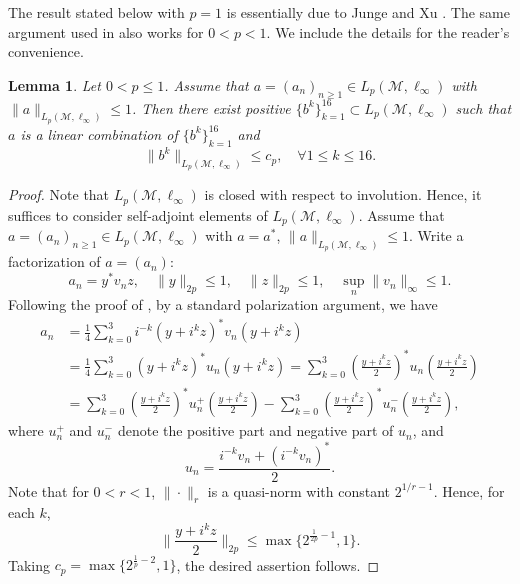 \documentclass[11]{amsart}
\numberwithin{equation}{section}
\newtheorem{lemma}[theorem]{Lemma}
\newcommand{\M}{\mathcal{M}}
\begin{document}
The  result stated below with $p=1$ is essentially due to Junge and Xu \cite[Proposition 2.1(i)]{JX2007}. The same argument used in \cite[Proposition 2.1(i)]{JX2007} also works for $0<p<1$. We include the details for the reader's convenience. 
\begin{lemma}\label{JX lemma}
Let $0<p\leq 1$. Assume that $a=(a_n)_{n\geq1}\in L_p(\M,\ell_{\infty})$ with $\|a\|_{L_p(\M,\ell_{\infty})}\leq 1$. Then there exist positive $\{b^k\}_{k=1}^{16}\subset L_p(\M,\ell_{\infty})$ such that $a$ is a linear combination of $\{b^k\}_{k=1}^{16}$ and 
$$\|b^k\|_{L_p(\M,\ell_{\infty})}\leq c_p,\quad \forall 1\leq k\leq 16.$$
\end{lemma}
\begin{proof}
Note that $L_p(\M,\ell_{\infty})$ is closed with respect
	to involution.  Hence, it suffices to consider self-adjoint elements of $L_p(\M,\ell_{\infty})$. Assume that $a=(a_n)_{n\geq1}\in L_p(\M,\ell_{\infty})$ with $a=a^*$, $\|a\|_{L_p(\M,\ell_{\infty})}\leq 1$. Write a
	factorization of $a=(a_n)$: 
	$$a_n=y^*v_nz,\quad \|y\|_{2p}\leq 1,\quad \|z\|_{2p}\leq 1,\quad \sup_n\|v_n\|_{\infty}\leq 1.$$
Following the proof of \cite[Proposition 2.1]{JX2007}, by a standard polarization argument, we have 
\begin{align*}
	a_n&=\frac{1}{4}\sum_{k=0}^3i^{-k}(y+i^kz)^*v_n(y+i^kz)\\
	&=\frac{1}{4}\sum_{k=0}^3(y+i^kz)^*u_n(y+i^kz)=\sum_{k=0}^3(\frac{y+i^kz}{2})^*u_n(\frac{y+i^kz}{2})\\
	&=\sum_{k=0}^3(\frac{y+i^kz}{2})^*u_n^+(\frac{y+i^kz}{2})-\sum_{k=0}^3(\frac{y+i^kz}{2})^*u_n^{-}(\frac{y+i^kz}{2}),
\end{align*}
where $u_n^+$ and $u_n^{-}$ denote the positive part and negative part of $u_n$, and 
$$u_n=\frac{i^{-k}v_n+(i^{-k}v_n)^*}{2}.$$
Note that for $0<r<1$, $\|\cdot\|_r$ is a quasi-norm with constant $2^{1/r-1}$. Hence, for each $k$,
$$\|\frac{y+i^kz}{2}\|_{2p}\leq \max\{2^{\frac{1}{2p}-1},1\}.$$
Taking $c_p=\max\{2^{\frac{1}{p}-2},1\}$, the desired assertion follows.
\end{proof}
\end{document}
